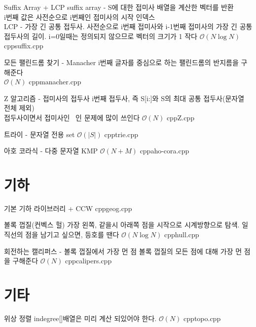 \documentclass[landscape, 10pt, a4paper, oneside, twocolumn]{extarticle}
\begin{document}
\Algorithm
{Suffix Array + LCP}
{suffix array - S에 대한 접미사 배열을 계산한 벡터를 반환\\
i번째 값은 사전순으로 i번째인 접미사의 시작 인덱스\\
LCP - 가장 긴 공통 접두사. 사전순으로 i번째 접미사와 i-1번째 접미사의 가장 긴 공통 접두사의 길이. i=0일때는 정의되지 않으므로 벡터의 크기가 1 작다}
{$\mathcal{O}(N\log{N})$}
{cpp}{suffix.cpp}

\Algorithm
{모든 팰린드롬 찾기 - Manacher}
{i번째 글자를 중심으로 하는 팰린드롬의 반지름을 구해준다\\
}
{$\mathcal{O}(N)$}
{cpp}{manacher.cpp}

\Algorithm
{Z 알고리즘 - 접미사의 접두사}
{i번째 접두사, 즉 S[i:]와 S의 최대 공통 접두사(문자열 전체 제외)\\
접두사이면서 접미사인~ 인 문제에 많이 쓰인다}
{$\mathcal{O}(N)$}
{cpp}{Z.cpp}

\Algorithm
{트라이 - 문자열 전용 set}
{}
{$\mathcal{O}(|S|)$}
{cpp}{trie.cpp}

\Algorithm
{아호 코라식 - 다중 문자열 KMP}
{}
{$\mathcal{O}(N+M)$}
{cpp}{aho-cora.cpp}

\section{기하}

\Algorithm
{기본 기하 라이브러리 + CCW}
{}
{}
{cpp}{geog.cpp}

\Algorithm
{볼록 껍질(컨벡스 헐)}
{가장 왼쪽, 같을시 아래쪽 점을 시작으로 시계방향으로 탐색.
일직선의 점을 남기고 싶으면, 등호를 땐다}
{$\mathcal{O}(N\log{N})$}
{cpp}{hull.cpp}

\Algorithm
{회전하는 캘리퍼스 - 볼록 껍질에서 가장 먼 점}
{볼록 껍질의 모든 점에 대해 가장 먼 점을 구해준다}
{$\mathcal{O}(N)$}
{cpp}{calipers.cpp}

\section{기타}

\Algorithm
{위상 정렬}
{indegree[]배열은 미리 계산 되있어야 한다.
}
{$\mathcal{O}(N)$}
{cpp}{topo.cpp}


\end{document}
